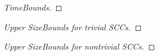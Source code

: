 \documentclass{scrartcl}
\newtheorem{proof}{Proof}
\newcommand{\Proof}[2]{
  \begin{proof}[#1]
    
  \end{proof}
}
\begin{document}

\Proof{TimeBounds}{timebound}


\Proof{Upper SizeBounds for trivial SCCs}{trivial_sizebound}


\Proof{Upper SizeBounds for nontrivial SCCs}{nontrivial_sizebound}
\end{document}
